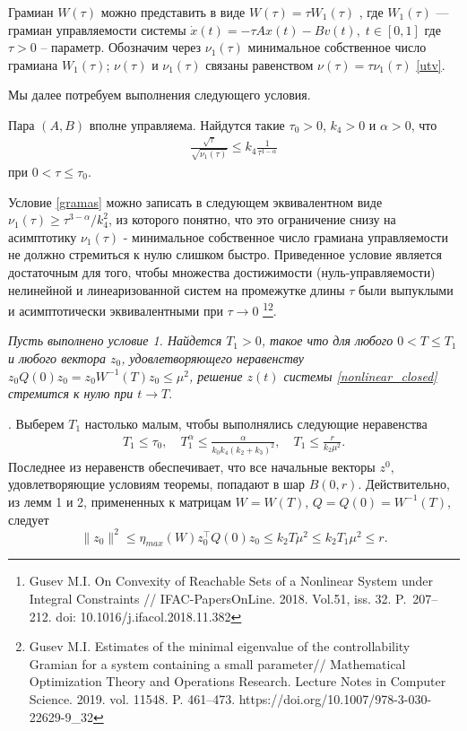 \documentclass[../main.tex]{subfiles}
\begin{document}
Грамиан $W(\tau)$ можно представить в виде $W(\tau) = \tau W_1(\tau)$ , где $W_1(\tau)$ --- грамиан управляемости системы $ \dot{x}(t) = -\tau A x(t) - B v(t),\;  t \in [0, 1]$ где  $ \tau > 0 $ -- параметр. Обозначим через $\nu_1(\tau)$ минимальное собственное число грамиана $W_1(\tau)$; $\nu(\tau)$ и $\nu_1(\tau)$ связаны равенством  $\nu(\tau)=\tau \nu_1(\tau)$ \eqref{utv}.

Мы далее потребуем выполнения следующего условия.
\begin{cond}\label{condC}
    Пара $(A,B)$ вполне управляема. Найдутся такие $\tau_0>0$,  $ k_4 > 0$ и $\alpha > 0$, что
    \begin{gather}\label{gramas}
        \frac{\sqrt{\tau}}{\sqrt{\nu_1(\tau)}} \leqslant k_4 \frac{1}{\tau^{1-\alpha}}
    \end{gather}
    при $0<\tau \leqslant \tau_0$.
\end{cond}

Условие \eqref{gramas} можно записать в следующем эквивалентном виде $\nu_1(\tau) \geqslant\tau^{3-\alpha}/k_4^2 $, из которого понятно, что это ограничение снизу на асимптотику $\nu_1(\tau)$ - минимальное собственное число грамиана управляемости не должно стремиться к нулю слишком быстро. 
Приведенное условие является достаточным для того, чтобы множества достижимости (нуль-управляемости) нелинейной и линеаризованной систем на промежутке длины $\tau$ были выпуклыми и асимптотически эквивалентными при $\tau \to 0$ \footnote{Gusev M.I. On Convexity of Reachable Sets of a Nonlinear System under Integral Constraints // IFAC-PapersOnLine. 2018. Vol.51, iss. 32. P.~207--212. doi: 10.1016/j.ifacol.2018.11.382}\footnote{Gusev M.I. Estimates of the minimal eigenvalue of the controllability Gramian for a system containing a small parameter//  Mathematical Optimization Theory and Operations Research. Lecture Notes in Computer Science. 2019. vol. 11548. P. 461--473.  https://doi.org/10.1007/978-3-030-22629-9\_32}.
\begin{theorem}
{\it Пусть выполнено условие 1. Найдется $T_1>0$, такое что для любого $0<T \leqslant T_1$ и любого вектора $z_0$, удовлетворяющего неравенству $z_0 Q(0)z_0=z_0 W^{-1}(T)z_0\leqslant \mu^2$, решение $z(t)$ системы \eqref{nonlinear_closed} стремится к нулю при $t \to T$}. 
\end{theorem}
\doc.
Выберем  $T_1$ настолько малым, чтобы выполнялись следующие неравенства
\begin{gather}\label{t1}
T_1 \leqslant \tau_0,\quad T_1^\alpha \leqslant
\frac{\alpha}{k_0k_4(k_2+k_3)^2}, \quad T_1 \leqslant \frac{r}{k_2\mu^2}.
\end{gather}
Последнее из неравенств обеспечивает, что все начальные векторы $z^0$, удовлетворяющие условиям теоремы, попадают в шар $B(0,r)$. Действительно, из лемм 1 и 2, примененных к матрицам $W=W(T)$, $Q=Q(0)=W^{-1}(T)$, следует 
        $$\| z_0 \|^2 \leqslant \eta_{max}(W)z_0^{\top}Q(0)z_0\leqslant k_2T\mu^2 \leqslant k_2T_1\mu^2 \leqslant r.$$  
  
\end{document}
